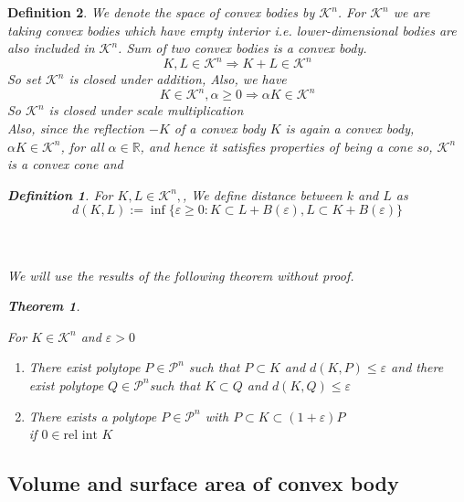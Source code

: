 \documentclass[oneside]{book}
\newtheorem{theorem}{Theorem}[section]
\newtheorem{mydef}{Definition}
\begin{document}
\begin{mydef}
 
 We denote  the space of convex bodies by  $\mathcal{K}^{n}$. For  $\mathcal{K}^{n}$  we are taking convex bodies which have empty interior i.e. lower-dimensional bodies are also included in $\mathcal{K}^{n}$. 
 Sum of two convex bodies is a convex body. \\
 $$
   K, L \in \mathcal{K}^{n} \Longrightarrow K+L \in \mathcal{K}^{n}
$$ 
 So  set $\mathcal{K}^{n}$ is closed under addition,
 Also, we have
 $$ 
K \in \mathcal{K}^{n}, \alpha \geq 0 \Longrightarrow \alpha K \in \mathcal{K}^{n}
$$
So  $\mathcal{K}^{n}$ is closed under scale multiplication \\
Also, since the reflection $-K$ of a convex body $K$ is again a convex body, $\alpha K \in \mathcal{K}^{n}$, for all $\alpha \in \mathbb{R}$, and hence it satisfies properties of being a cone so,  $\mathcal{K}^{n}$ is a convex cone and 
\begin{mydef}	 \label{d:13}
For  $ K, L \in \mathcal{K}^{n}, $, We define distance between $k$ and $L$ as 
\begin{equation}
\label{eq42}
d(K, L):=\inf \{\varepsilon \geq 0: K \subset L+B(\varepsilon), L \subset K+B(\varepsilon)\}
\end{equation}
\end{mydef}
\quad 
\\\\
We will use the results of the following theorem without proof. 

\begin{theorem}
\label{t:8}

For  $K \in \mathcal{K}^{n}$ and $\varepsilon>0$ \\
\begin{enumerate}
\item
There exist  polytope $ P  \in \mathcal{P}^{n}$ such that  $P \subset K$ and  $d(K, P) \leq \varepsilon$ \newline 
and \newline
  there exist polytope $Q \in \mathcal{P}^{n}$such that  $K \subset Q$ and $d(K, Q) \leq \varepsilon$ 
\item 
  There exists a polytope $P \in \mathcal{P}^{n}$ with $P \subset K \subset(1+\varepsilon) P$ \\
  if $0 \in \text{rel int } K $ \label{4.1.5}
\end{enumerate}
\end{theorem}
 \subsection{Volume and surface area of convex body} \label{ss:19}


\end{mydef}
\end{document}
